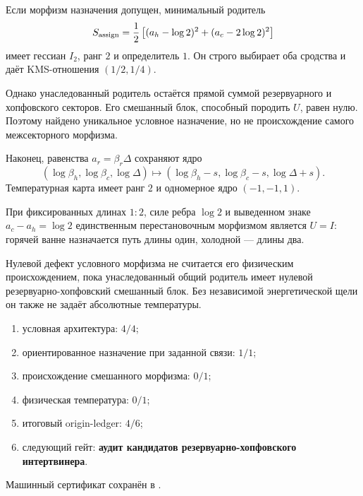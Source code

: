 Если морфизм назначения допущен, минимальный родитель
\begin{equation}
 S_{\rm assign}=\frac12\left[(a_h-\log2)^2+(a_c-2\log2)^2\right]
\end{equation}
имеет гессиан $I_2$, ранг $2$ и определитель $1$. Он строго выбирает оба
сродства и даёт KMS-отношения $(1/2,1/4)$.

Однако унаследованный родитель остаётся прямой суммой резервуарного и
хопфовского секторов. Его смешанный блок, способный породить $U$, равен
нулю. Поэтому найдено уникальное условное назначение, но не происхождение
самого межсекторного морфизма.

Наконец, равенства $a_r=\beta_r\Delta$ сохраняют ядро
\begin{equation}
 (\log\beta_h,\log\beta_c,\log\Delta)
 \longmapsto
 (\log\beta_h-s,\log\beta_c-s,\log\Delta+s).
\end{equation}
Температурная карта имеет ранг $2$ и одномерное ядро $(-1,-1,1)$.

\begin{theorem}
При фиксированных длинах $1:2$, силе ребра $\log2$ и выведенном знаке
$a_c-a_h=\log2$ единственным перестановочным морфизмом является
$U=I$: горячей ванне назначается путь длины один, холодной --- длины два.
\end{theorem}

\begin{nogocriterion}
Нулевой дефект условного морфизма не считается его физическим происхождением,
пока унаследованный общий родитель имеет нулевой резервуарно-хопфовский
смешанный блок. Без независимой энергетической щели он также не задаёт
абсолютные температуры.
\end{nogocriterion}

\begin{protocol}\begin{enumerate}
\item условная архитектура: \textbf{$4/4$};
\item ориентированное назначение при заданной связи: \textbf{$1/1$};
\item происхождение смешанного морфизма: \textbf{$0/1$};
\item физическая температура: \textbf{$0/1$};
\item итоговый origin-ledger: \textbf{$4/6$};
\item следующий гейт: \textbf{аудит кандидатов резервуарно-хопфовского интертвинера}.
\end{enumerate}\end{protocol}

Машинный сертификат сохранён в
.